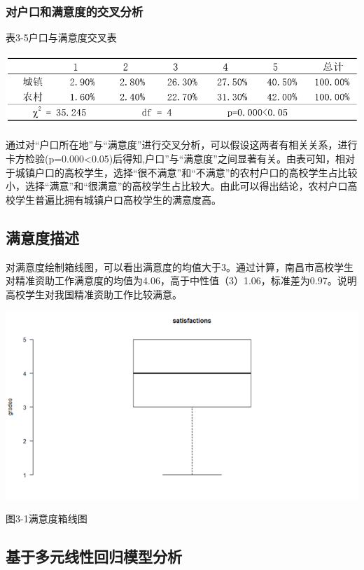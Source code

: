 \documentclass[UTF8,a4paper,12pt]{ctexart}  %
\begin{document}
\hypertarget{section-26}{%
\subsubsection{对户口和满意度的交叉分析}\label{section-26}}

表3-5户口与满意度交叉表

\includegraphics{id3_5.png}

通过对``户口所在地''与``满意度''进行交叉分析，可以假设这两者有相关关系，进行卡方检验(p=0.000\textless0.05)后得知,户口''与``满意度''之间显著有关。由表可知，相对于城镇户口的高校学生，选择``很不满意''和``不满意''的农村户口的高校学生占比较小，选择``满意''和``很满意''的高校学生占比较大。由此可以得出结论，农村户口高校学生普遍比拥有城镇户口高校学生的满意度高。

\hypertarget{section-27}{%
\subsection{满意度描述}\label{section-27}}

对满意度绘制箱线图，可以看出满意度的均值大于3。通过计算，南昌市高校学生对精准资助工作满意度的均值为4.06，高于中性值（3）1.06，标准差为0.97。说明高校学生对我国精准资助工作比较满意。

\includegraphics{idsatis.png}

图3-1满意度箱线图

\hypertarget{section-28}{%
\subsection{基于多元线性回归模型分析}\label{section-28}}
\end{document}
